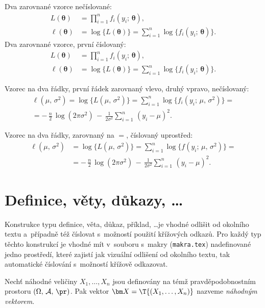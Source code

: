 Dva zarovnané vzorce nečíslované:
\begin{align*}
L(\bm\theta) &= \prod_{i=1}^n f_i(y_i;\,\bm\theta), \\
\ell(\bm\theta) &= \log\bigl\{L(\bm\theta)\bigr\} =
\sum_{i=1}^n \log\bigl\{f_i(y_i;\,\bm\theta)\bigr\}.
\end{align*}
Dva zarovnané vzorce, první číslovaný:
\begin{align}
L(\bm\theta) &= \prod_{i=1}^n f_i(y_i;\,\bm\theta), \label{eq01:L} \\
\ell(\bm\theta) &= \log\bigl\{L(\bm\theta)\bigr\} =
\sum_{i=1}^n \log\bigl\{f_i(y_i;\,\bm\theta)\bigr\}. \nonumber
\end{align}

Vzorec na dva řádky, první řádek zarovnaný vlevo, druhý vpravo, nečíslovaný:
\begin{multline*}
\ell(\mu,\,\sigma^2) = \log\bigl\{L(\mu,\,\sigma^2)\bigr\} =
\sum_{i=1}^n \log\bigl\{f_i(y_i;\,\mu,\,\sigma^2)\bigr\}= \\
  = -\,\frac{n}{2}\,\log(2\pi\sigma^2) \,-\,
\frac{1}{2\sigma^2}\sum_{i=1}^n\,(y_i - \mu)^2.
\end{multline*}

Vzorec na dva řádky, zarovnaný na $=$, číslovaný uprostřed:
\begin{equation}\label{eq01:ell}
\begin{split}
\ell(\mu,\,\sigma^2) &= \log\bigl\{L(\mu,\,\sigma^2)\bigr\} =
\sum_{i=1}^n \log\bigl\{f(y_i;\,\mu,\,\sigma^2)\bigr\}= \\
& = -\,\frac{n}{2}\,\log(2\pi\sigma^2) \,-\,
\frac{1}{2\sigma^2}\sum_{i=1}^n\,(y_i - \mu)^2.
\end{split}
\end{equation}

\section{Definice, věty, důkazy, \dots}

Konstrukce typu definice, věta, důkaz, příklad, \dots je vhodné
odlišit od okolního textu a~případně též číslovat s~možností použití
křížových odkazů. Pro každý typ těchto konstrukcí je vhodné mít
v~souboru s~makry (\texttt{makra.tex}) nadefinované jedno prostředí,
které zajistí jak vizuální odlišení od okolního textu, tak
automatické číslování s~možností křížově odkazovat.

\begin{definice}\label{def01:1}
  Nechť náhodné veličiny $X_1,\dots,X_n$ jsou definovány na témž
  prav\-dě\-po\-dob\-nost\-ním prostoru $(\Omega,\,\mathcal{A},\,\pr)$. Pak
  vektor $\bm X = \T{(X_1,\dots,X_n)}$ nazveme \emph{náhodným
    vektorem}.
\end{definice}

